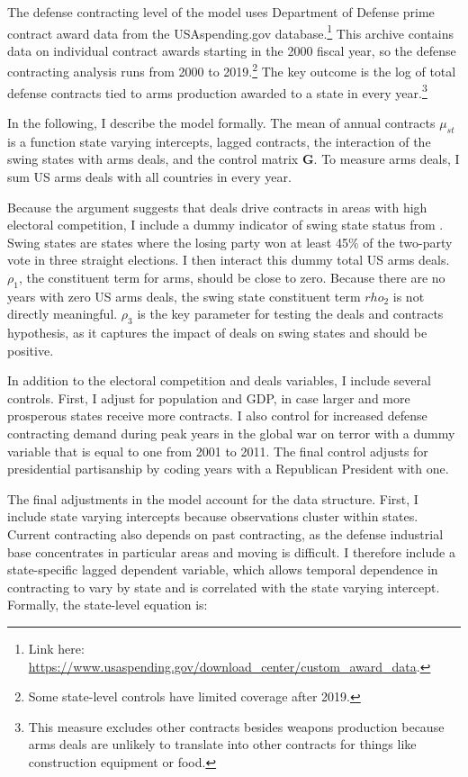 \documentclass[12pt]{article}
\begin{document}
The defense contracting level of the model uses Department of Defense prime contract award data from the USAspending.gov database.\footnote{Link here: \url{https://www.usaspending.gov/download_center/custom_award_data}.} 
This archive contains data on individual contract awards starting in the 2000 fiscal year, so the defense contracting analysis runs from 2000 to 2019.\footnote{Some state-level controls have limited coverage after 2019.}
The key outcome is the log of total defense contracts tied to arms production awarded to a state in every year.\footnote{This measure excludes other contracts besides weapons production because arms deals are unlikely to translate into other contracts for things like construction equipment or food.}


In the following, I describe the model formally.
The mean of annual contracts $\mu_{st}$ is a function state varying intercepts, lagged contracts, the interaction of the swing states with arms deals, and the control matrix \textbf{G}. 
To measure arms deals, I sum US arms deals with all countries in every year. 


Because the argument suggests that deals drive contracts in areas with high electoral competition, I include a dummy indicator of swing state status from \citep{KrinerReeves2015}.
Swing states are states where the losing party won at least 45\% of the two-party vote in three straight elections. 
I then interact this dummy total US arms deals. 
$\rho_1$, the constituent term for arms, should be close to zero.
Because there are no years with zero US arms deals, the swing state constituent term $rho_2$ is not directly meaningful.  
$\rho_3$ is the key parameter for testing the deals and contracts hypothesis, as it captures the impact of deals on swing states and should be positive. 


In addition to the electoral competition and deals variables, I include several controls. 
First, I adjust for population and GDP, in case larger and more prosperous states receive more contracts. 
I also control for increased defense contracting demand during peak years in the global war on terror with a dummy variable that is equal to one from 2001 to 2011. 
The final control adjusts for presidential partisanship by coding years with a Republican President with one. 


The final adjustments in the model account for the data structure.
First, I include state varying intercepts because observations cluster within states. 
Current contracting also depends on past contracting, as the defense industrial base concentrates in particular areas and moving is difficult. 
I therefore include a state-specific lagged dependent variable, which allows temporal dependence in contracting to vary by state and is correlated with the state varying intercept.\citep{See the appendix for descriptive evidence that temporal dependence in contracting varies by state and the state-level autoregressive parameters.}
Formally, the state-level equation is: 
\end{document}
